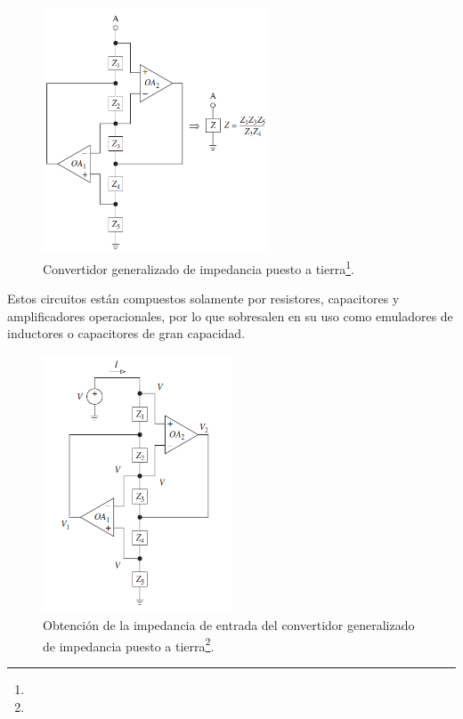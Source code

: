 \begin{figure}[H]
	\centering
	\includegraphics[width=0.6\textwidth]{Imagenes/gic.PNG}
	\caption[]{Convertidor generalizado de impedancia puesto a tierra\protect\footnote{}.}
	\label{fig:gic}
\end{figure}


Estos circuitos están compuestos solamente por resistores, capacitores y amplificadores operacionales, por lo que sobresalen en su uso como emuladores de inductores o capacitores de gran capacidad.

\begin{figure}[H]
	\centering
	\includegraphics[width=0.5\textwidth]{Imagenes/gic_zin.PNG}
	\caption[]{Obtención de la impedancia de entrada del convertidor generalizado de impedancia puesto a tierra\protect\footnote{}.}
	\label{fig:gic_zin}
\end{figure}

